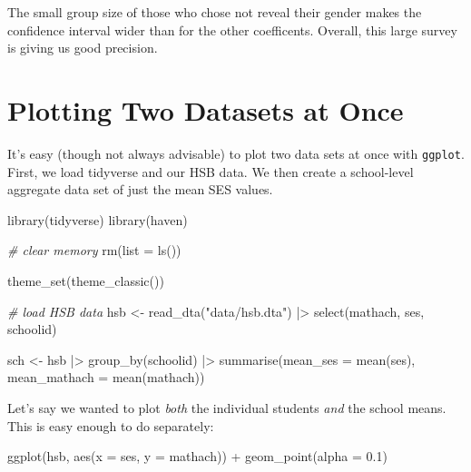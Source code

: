 \documentclass[
  letterpaper,
  DIV=11,
  numbers=noendperiod]{scrreprt}
\newenvironment{Shaded}{}{}
\newcommand{\AttributeTok}[1]{\textcolor[rgb]{0.49,0.56,0.16}{#1}}
\newcommand{\CommentTok}[1]{\textcolor[rgb]{0.38,0.63,0.69}{\textit{#1}}}
\newcommand{\FloatTok}[1]{\textcolor[rgb]{0.25,0.63,0.44}{#1}}
\newcommand{\FunctionTok}[1]{\textcolor[rgb]{0.02,0.16,0.49}{#1}}
\newcommand{\NormalTok}[1]{#1}
\newcommand{\OtherTok}[1]{\textcolor[rgb]{0.00,0.44,0.13}{#1}}
\newcommand{\SpecialCharTok}[1]{\textcolor[rgb]{0.25,0.44,0.63}{#1}}
\newcommand{\StringTok}[1]{\textcolor[rgb]{0.25,0.44,0.63}{#1}}
\begin{document}
The small group size of those who chose not reveal their gender makes
the confidence interval wider than for the other coefficents. Overall,
this large survey is giving us good precision.

\chapter{Plotting Two Datasets at
Once}\label{plotting-two-datasets-at-once}

It's easy (though not always advisable) to plot two data sets at once
with \texttt{ggplot}. First, we load tidyverse and our HSB data. We then
create a school-level aggregate data set of just the mean SES values.

\begin{Shaded}
\begin{Highlighting}[]
\FunctionTok{library}\NormalTok{(tidyverse)}
\FunctionTok{library}\NormalTok{(haven)}

\CommentTok{\# clear memory}
\FunctionTok{rm}\NormalTok{(}\AttributeTok{list =} \FunctionTok{ls}\NormalTok{())}

\FunctionTok{theme\_set}\NormalTok{(}\FunctionTok{theme\_classic}\NormalTok{())}

\CommentTok{\# load HSB data}
\NormalTok{hsb }\OtherTok{\textless{}{-}} \FunctionTok{read\_dta}\NormalTok{(}\StringTok{"data/hsb.dta"}\NormalTok{) }\SpecialCharTok{|\textgreater{}} 
  \FunctionTok{select}\NormalTok{(mathach, ses, schoolid)}

\NormalTok{sch }\OtherTok{\textless{}{-}}\NormalTok{ hsb }\SpecialCharTok{|\textgreater{}} 
  \FunctionTok{group\_by}\NormalTok{(schoolid) }\SpecialCharTok{|\textgreater{}} 
  \FunctionTok{summarise}\NormalTok{(}\AttributeTok{mean\_ses =} \FunctionTok{mean}\NormalTok{(ses),}
            \AttributeTok{mean\_mathach =} \FunctionTok{mean}\NormalTok{(mathach))}
\end{Highlighting}
\end{Shaded}

Let's say we wanted to plot \emph{both} the individual students
\emph{and} the school means. This is easy enough to do separately:

\begin{Shaded}
\begin{Highlighting}[]
\FunctionTok{ggplot}\NormalTok{(hsb, }\FunctionTok{aes}\NormalTok{(}\AttributeTok{x =}\NormalTok{ ses, }\AttributeTok{y =}\NormalTok{ mathach)) }\SpecialCharTok{+}
  \FunctionTok{geom\_point}\NormalTok{(}\AttributeTok{alpha =} \FloatTok{0.1}\NormalTok{)}
\end{Highlighting}
\end{Shaded}
\end{document}
